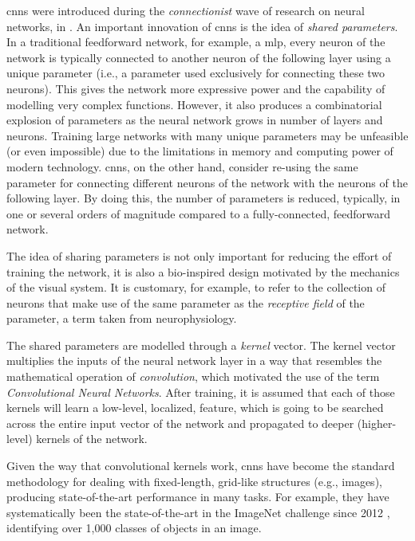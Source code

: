 

\glspl{cnn} were introduced during the \emph{connectionist}
wave of research on neural networks, in
\textcite{lecun1989generalization, lecun1989handwritten}. An
important innovation of \glspl{cnn} is the idea of
\emph{shared parameters}. In a traditional feedforward
network, for example, a \gls{mlp}, every neuron of the
network is typically connected to another neuron of the
following layer using a unique parameter (i.e., a parameter
used exclusively for connecting these two neurons). This
gives the network more expressive power and the capability
of modelling very complex functions. However, it also
produces a combinatorial explosion of parameters as the
neural network grows in number of layers and neurons.
Training large networks with many unique parameters may be
unfeasible (or even impossible) due to the limitations in
memory and computing power of modern technology.
\glspl{cnn}, on the other hand, consider re-using the same
parameter for connecting different neurons of the network
with the neurons of the following layer. By doing this, the
number of parameters is reduced, typically, in one or
several orders of magnitude compared to a fully-connected,
feedforward network.

The idea of sharing parameters is not only important for
reducing the effort of training the network, it is also a
bio-inspired design motivated by the mechanics of the visual
system. It is customary, for example, to refer to the
collection of neurons that make use of the same parameter as
the \emph{receptive field} of the parameter, a term taken
from neurophysiology.

The shared parameters are modelled through a \emph{kernel}
vector. The kernel vector multiplies the inputs of the
neural network layer in a way that resembles the
mathematical operation of \emph{convolution}, which
motivated the use of the term \emph{Convolutional Neural
Networks}. After training, it is assumed that each of those
kernels will learn a low-level, localized, feature, which is
going to be searched across the entire input vector of the
network and propagated to deeper (higher-level) kernels of
the network.

Given the way that convolutional kernels work, \glspl{cnn}
have become the standard methodology for dealing with
fixed-length, grid-like structures (e.g., images), producing
state-of-the-art performance in many tasks. For example,
they have systematically been the state-of-the-art in the
ImageNet challenge since 2012
\parencite{krizhevsky2012imagenet}, identifying over 1,000
classes of objects in an image.

